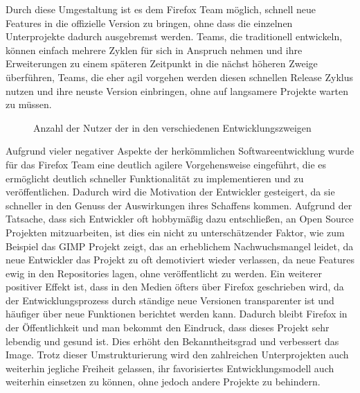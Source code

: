 Durch diese Umgestaltung ist es dem Firefox Team möglich, schnell neue Features in die offizielle Version zu bringen, ohne dass die einzelnen Unterprojekte dadurch ausgebremst werden. Teams, die traditionell entwickeln, können einfach mehrere Zyklen für sich in Anspruch nehmen und ihre Erweiterungen zu einem späteren Zeitpunkt in die nächst höheren Zweige überführen, Teams, die eher agil vorgehen werden diesen schnellen Release Zyklus nutzen und ihre neuste Version einbringen, ohne auf langsamere Projekte warten zu müssen.
\begin{figure}[h]
	\centering
	\caption{Anzahl der Nutzer der in den verschiedenen Entwicklungszweigen}
	\label{fireusers}
\end{figure}

Aufgrund vieler negativer Aspekte der herkömmlichen Softwareentwicklung wurde für das Firefox Team eine deutlich agilere Vorgehensweise eingeführt, die es ermöglicht deutlich schneller Funktionalität zu implementieren und zu veröffentlichen. Dadurch wird die Motivation der Entwickler gesteigert, da sie schneller in den Genuss der Auswirkungen ihres Schaffens kommen. Aufgrund der Tatsache, dass sich Entwickler oft hobbymäßig dazu entschließen, an Open Source Projekten mitzuarbeiten, ist dies ein nicht zu unterschätzender Faktor, wie zum Beispiel das GIMP Projekt zeigt, das an erheblichem Nachwuchsmangel leidet, da neue Entwickler das Projekt zu oft demotiviert wieder verlassen,  da neue Features ewig in den Repositories lagen, ohne veröffentlicht zu werden\cite{bib:gimp}. Ein weiterer positiver Effekt ist, dass in den Medien öfters über Firefox geschrieben wird, da der Entwicklungsprozess durch ständige neue Versionen transparenter ist und häufiger über neue Funktionen berichtet werden kann. Dadurch bleibt Firefox in der Öffentlichkeit und man bekommt den Eindruck, dass dieses Projekt sehr lebendig und gesund ist. Dies erhöht den Bekanntheitsgrad und verbessert das Image. Trotz dieser Umstrukturierung wird den zahlreichen Unterprojekten auch weiterhin jegliche Freiheit gelassen, ihr favorisiertes Entwicklungsmodell auch weiterhin einsetzen zu können, ohne jedoch andere Projekte zu behindern.

